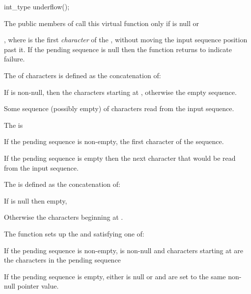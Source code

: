 %
\begin{itemdecl}
int_type underflow();
\end{itemdecl}

\begin{itemdescr}
\pnum
\remarks
The public members of
call this virtual function only if
is null or

\pnum
\returns
{},
where  is the first
\textit{character}
of the
,
without moving the input sequence position past it.
If the pending sequence is null then the function returns
to indicate failure.

\pnum
The
of characters is defined as the concatenation of:
\begin{enumeratea}
\item
If
is non-null, then the
characters starting at
,
otherwise the empty sequence.
\item
Some sequence (possibly empty) of characters read from the input sequence.
\end{enumeratea}

\pnum
The
is
\begin{enumeratea}
\item
If the pending sequence is non-empty, the first character of the sequence.
\item
If the pending sequence
is
empty then the next character that would be read from the input sequence.
\end{enumeratea}

\pnum
The
is defined as the concatenation of:
\begin{enumeratea}
\item
If
is null then empty,
\item
Otherwise the
characters beginning at
.
\end{enumeratea}

\pnum
\effects
The function sets up the
and
satisfying one of:
\begin{enumeratea}
\item
If the pending sequence is non-empty,
is non-null and
characters starting at
are the characters in the pending sequence
\item
If the pending sequence is empty, either
is null or
and
are set to the same non-null pointer value.
\end{enumeratea}


\end{itemdescr}
